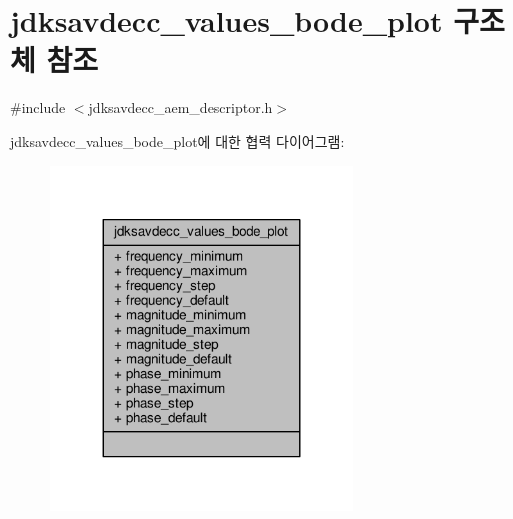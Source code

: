 \hypertarget{structjdksavdecc__values__bode__plot}{}\section{jdksavdecc\+\_\+values\+\_\+bode\+\_\+plot 구조체 참조}
\label{structjdksavdecc__values__bode__plot}


{\ttfamily \#include $<$jdksavdecc\+\_\+aem\+\_\+descriptor.\+h$>$}



jdksavdecc\+\_\+values\+\_\+bode\+\_\+plot에 대한 협력 다이어그램\+:
\nopagebreak
\begin{figure}[H]
\begin{center}
\leavevmode
\includegraphics[width=227pt]{structjdksavdecc__values__bode__plot__coll__graph}
\end{center}
\end{figure}
